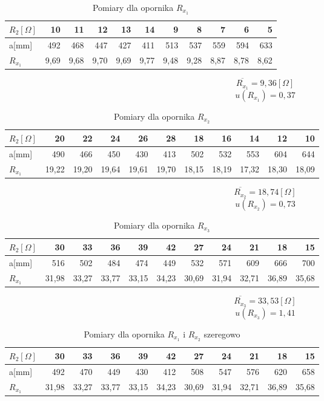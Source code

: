 \documentclass[a4paper,10pt,twoside]{article}
\begin{document}
	\begin{table}
		\centering
		\begin{tabular}{|l|r|r|r|r|r|r|r|r|r|r|}
			\hline
			$R_2[\Omega]$  & 10    & 11   & 12    & 13    & 14   & 9   & 8    & 7     & 6     & 5    \\
			\hline
			a[mm]  & 492   & 468  & 447 & 427   & 411  & 513  & 537  & 559   & 594   & 633   \\
			\hline
			$R_{x_1}$ & 9,69 & 9,68 & 9,70 & 9,69 & 9,77 & 9,48 & 9,28 & 8,87 & 8,78 & 8,62\\
			\hline                      
		\end{tabular}
		\caption{Pomiary dla opornika $R_{x_1}$}
		\label{tab:Rx1}
	\end{table}
$$\overline{R_{x_1}}=9,36 [\Omega]$$
$$u(R_{x_1})=0,37$$
\begin{table}
	\centering
	\begin{tabular}{|l|r|r|r|r|r|r|r|r|r|r|}
		\hline
		$R_2[\Omega]$  & 20    & 22   & 24    & 26    & 28   & 18   & 16    & 14     & 12     & 10   \\
		\hline
		a[mm]  & 490   & 466  & 450 & 430   & 413  & 502  & 532  & 553   & 604   & 644   \\
		\hline
		$R_{x_1}$ & 19,22 & 19,20 & 19,64 & 19,61 & 19,70 & 18,15 & 18,19 & 17,32 & 18,30 & 18,09\\
		\hline                      
	\end{tabular}
	\caption{Pomiary dla opornika $R_{x_2}$}
	\label{tab:Rx1}
\end{table}
$$\overline{R_{x_2}}=18,74 [\Omega]$$
$$u(R_{x_2})=0,73$$
\begin{table}
	\centering
	\begin{tabular}{|l|r|r|r|r|r|r|r|r|r|r|}
		\hline
		$R_2[\Omega]$  & 30    & 33   & 36    & 39    & 42   & 27   & 24    & 21     & 18     & 15   \\
		\hline
		a[mm]  & 516   & 502  & 484 & 474   & 449  & 532  & 571  & 609   & 666   & 700   \\
		\hline
		$R_{x_1}$ & 31,98 & 33,27 & 33,77 & 33,15 & 34,23 & 30,69 & 31,94 & 32,71 & 36,89 & 35,68\\
		\hline                      
	\end{tabular}
	\caption{Pomiary dla opornika $R_{x_3}$}
	\label{tab:Rx1}
\end{table}
$$\overline{R_{x_3}}=33,53 [\Omega]$$
$$u(R_{x_3})=1,41$$
\begin{table}
	\centering
	\begin{tabular}{|l|r|r|r|r|r|r|r|r|r|r|}
		\hline
		$R_2[\Omega]$  & 30    & 33   & 36    & 39    & 42   & 27   & 24    & 21     & 18     & 15   \\
		\hline
		a[mm]  & 492   & 470  & 449 & 430   & 412  & 508  & 547  & 576   & 620   & 658   \\
		\hline
		$R_{x_1}$ & 31,98 & 33,27 & 33,77 & 33,15 & 34,23 & 30,69 & 31,94 & 32,71 & 36,89 & 35,68\\
		\hline                      
	\end{tabular}
	\caption{Pomiary dla opornika $R_{x_1}$ i $R_{x_2}$ szeregowo}
	\label{tab:Rx1}
\end{table}
\end{document}
